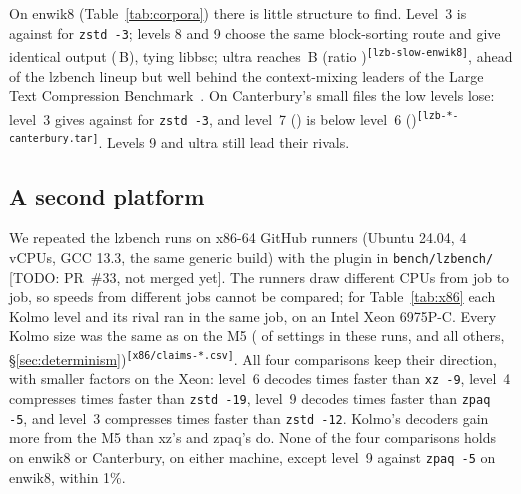 \documentclass[conference]{IEEEtran}
\newcommand{\src}[1]{\textsuperscript{\tiny\color{gray}\texttt{[#1]}}}
\newcommand{\todoin}[1]{{\color{red}\footnotesize[TODO: #1]}}
\newcommand{\src}[1]{}
\newcommand{\todoin}[1]{}
\begin{document}
\begin{table}[t]
\caption{enwik8 and Canterbury, one thread, lzbench 2.4.1, Apple M5. Source:
\texttt{data/lzb-\{fast,slow\}-\{enwik8,canterbury.tar\}.csv}.}\label{tab:corpora}
\centering\scriptsize\setlength{\tabcolsep}{3pt}

\end{table}

On enwik8 (Table~\ref{tab:corpora}) there is little structure to find. Level~3 is \numEnwKThree{} against
\numEnwZThree{} for \texttt{zstd -3}; levels 8 and 9 choose the same block-sorting route and give identical output
(\numEnwKNineBytes\,B), tying libbsc; ultra reaches \numEnwKUBytes\,B (ratio \numEnwKU)\src{lzb-slow-enwik8}, ahead
of the lzbench lineup but well behind the context-mixing leaders of the Large Text Compression
Benchmark~\cite{ltcb}. On Canterbury's small files the low levels lose: level~3 gives \numCantKThree{} against
\numCantZThree{} for \texttt{zstd -3}, and level~7 (\numCantKSeven) is below level~6
(\numCantKSix)\src{lzb-*-canterbury.tar}. Levels 9 and ultra still lead their rivals.

\subsection{A second platform}\label{sec:x86}

\begin{table}[t]
\caption{The four Silesia comparisons on two machines, one thread, lzbench 2.4.1. Size: Kolmo's output against the
rival's (negative is smaller), identical on both machines. C$\times$, D$\times$: Kolmo's compression and
decompression speed over the rival's. On x86-64 each pair ran in one GitHub job on one CPU, median of three runs.
Sources: \texttt{data/lzb-*-silesia.tar.csv}, \texttt{data/x86/claims-silesia.tar.run\{1,2,3\}.csv}.}\label{tab:x86}
\centering\scriptsize\setlength{\tabcolsep}{3.4pt}

\end{table}

We repeated the lzbench runs on x86-64 GitHub runners (Ubuntu 24.04, 4 vCPUs, GCC 13.3, the same generic build) with
the plugin in \texttt{bench/lzbench/} \todoin{PR~\#33, not merged yet}. The runners draw different CPUs from job to job, so speeds from different jobs
cannot be compared; for Table~\ref{tab:x86} each Kolmo level and its rival ran in the same job, on an Intel Xeon
6975P-C. Every Kolmo size was the same as on the M5 (\numXSizesSame{} of \numXSizesTotal{} settings in these runs,
and all others, \S\ref{sec:determinism})\src{x86/claims-*.csv}. All four comparisons keep their direction, with
smaller factors on the Xeon: level~6 decodes \numXSixD{} times faster than \texttt{xz -9}, level~4 compresses
\numXFourC{} times faster than \texttt{zstd -19}, level~9 decodes \numXNineD{} times faster than \texttt{zpaq -5},
and level~3 compresses \numXThreeC{} times faster than \texttt{zstd -12}. Kolmo's decoders gain more from the M5
than xz's and zpaq's do. None of the four comparisons holds on enwik8 or Canterbury, on either machine, except
level~9 against \texttt{zpaq -5} on enwik8, within 1\%.
\end{document}
